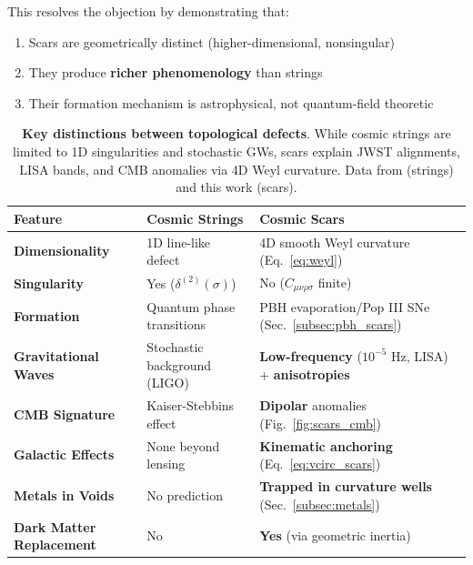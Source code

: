 \documentclass{article}
\begin{document}
This resolves the objection by demonstrating that:
\begin{enumerate}
    \item Scars are geometrically distinct (higher-dimensional, nonsingular)
    \item They produce \textbf{richer phenomenology} than strings
    \item Their formation mechanism is astrophysical, not quantum-field theoretic
\end{enumerate}

\begin{table}[H]
\centering
\begin{tabularx}{\textwidth}{l>{\raggedright\arraybackslash}X>{\raggedright\arraybackslash}X}
\hline
\textbf{Feature} & \textbf{Cosmic Strings} & \textbf{Cosmic Scars} \\
\hline
\textbf{Dimensionality} & 1D line-like defect & 4D smooth Weyl curvature (Eq.~\ref{eq:weyl}) \\
\hline
\textbf{Singularity} & Yes ($\delta^{(2)}(\sigma)$) & No ($C_{\mu\nu\rho\sigma}$ finite) \\
\hline
\textbf{Formation} & Quantum phase transitions & PBH evaporation/Pop III SNe (Sec.~\ref{subsec:pbh_scars}) \\
\hline
\textbf{Gravitational Waves} & Stochastic background (LIGO) & \textbf{Low-frequency} ($10^{-5}$ Hz, LISA) + \textbf{anisotropies} \\
\hline
\textbf{CMB Signature} & Kaiser-Stebbins effect & \textbf{Dipolar} anomalies (Fig.~\ref{fig:scars_cmb}) \\
\hline
\textbf{Galactic Effects} & None beyond lensing & \textbf{Kinematic anchoring} (Eq.~\ref{eq:vcirc_scars}) \\
\hline
\textbf{Metals in Voids} & No prediction & \textbf{Trapped in curvature wells} (Sec.~\ref{subsec:metals}) \\
\hline
\textbf{Dark Matter Replacement} & No & \textbf{Yes} (via geometric inertia) \\
\hline
\end{tabularx}
\caption{
    \textbf{Key distinctions between topological defects}. 
    While cosmic strings are limited to 1D singularities and stochastic GWs, 
    scars explain JWST alignments, LISA bands, and CMB anomalies via 4D Weyl curvature. 
    Data from \cite{Vilenkin2000} (strings) and this work (scars).
}
\label{tab:scars_vs_strings}
\end{table}
\end{document}
